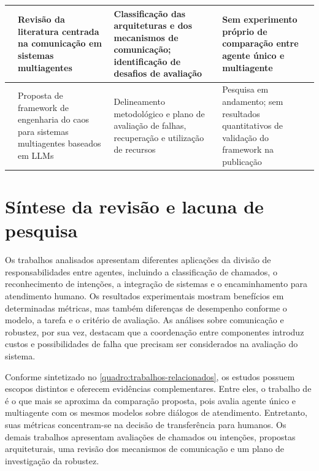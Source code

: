 \begin{quadro}[htb]
\begin{tabularx}{\textwidth}{
        |>{\raggedright\arraybackslash}p{2.5cm}
        |>{\raggedright\arraybackslash}X
        |>{\raggedright\arraybackslash}X
        |>{\raggedright\arraybackslash}X|
    }
        \textcite{yan2026} &
        Revisão da literatura centrada na comunicação
        em sistemas multiagentes &
        Classificação das arquiteturas e dos mecanismos
        de comunicação; identificação de desafios de avaliação &
        Sem experimento próprio de comparação entre
        agente único e multiagente \\
        \hline

        \textcite{owotogbe2025} &
        Proposta de framework de engenharia do caos
        para sistemas multiagentes baseados em LLMs &
        Delineamento metodológico e plano de avaliação
        de falhas, recuperação e utilização de recursos &
        Pesquisa em andamento; sem resultados quantitativos
        de validação do framework na publicação \\
        \hline
    \end{tabularx}

    \fonteproprioautor
\end{quadro}

\section{Síntese da revisão e lacuna de pesquisa}
\label{sec:sintese-revisao}

Os trabalhos analisados apresentam diferentes aplicações da divisão de responsabilidades entre agentes, incluindo a classificação de chamados, o reconhecimento de intenções, a integração de sistemas e o encaminhamento para atendimento humano. Os resultados experimentais mostram benefícios em determinadas métricas, mas também diferenças de desempenho conforme o modelo, a tarefa e o critério de avaliação. As análises sobre comunicação e robustez, por sua vez, destacam que a coordenação entre componentes introduz custos e possibilidades de falha que precisam ser considerados na avaliação do sistema.

Conforme sintetizado no \autoref{quadro:trabalhos-relacionados}, os estudos possuem escopos distintos e oferecem evidências complementares. Entre eles, o trabalho de \textcite{amri2026} é o que mais se aproxima da comparação proposta, pois avalia agente único e multiagente com os mesmos modelos sobre diálogos de atendimento. Entretanto, suas métricas concentram-se na decisão de transferência para humanos. Os demais trabalhos apresentam avaliações de chamados ou intenções, propostas arquiteturais, uma revisão dos mecanismos de comunicação e um plano de investigação da robustez.

